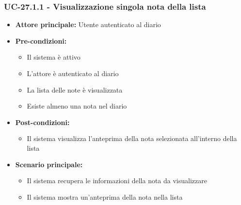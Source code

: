 \documentclass[a4paper,12pt]{article}
\begin{document}
\subsubsection{UC-27.1.1 - Visualizzazione singola nota della lista} \label{subsec:UC-27.1.1}
\begin{itemize}
    \item \textbf{Attore principale:} Utente autenticato al diario
    \item \textbf{Pre-condizioni:}
    \begin{itemize}
        \item Il sistema è attivo
        \item L'attore è autenticato al diario
        \item La lista delle note è visualizzata
        \item Esiste almeno una nota nel diario
    \end{itemize}
    \item \textbf{Post-condizioni:} 
    \begin{itemize}
        \item Il sistema visualizza l'anteprima della nota selezionata all'interno della lista
    \end{itemize}
    \item \textbf{Scenario principale:} 
    \begin{itemize}
        \item Il sistema recupera le informazioni della nota da visualizzare
        \item Il sistema mostra un'anteprima della nota nella lista
    \end{itemize}
\end{itemize}
\end{document}
